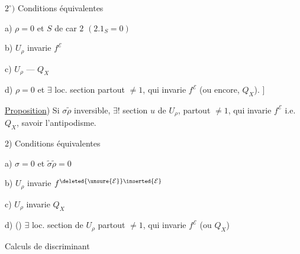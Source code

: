 $2^\circ)$ Conditions équivalentes

a) $\rho=0$ et  $S$ de car $2$ $(2.1_S=0)$

b) $U_\rho$ invarie $f^{\mathcal E}$

c) $U_\rho$ --- $Q_X$

d) $\rho=0$ et $\exists$ loc. section partout $\ne1$,
qui invarie $f^{\mathcal E}$ (ou encore, $Q_X$). ]


\uline{Proposition}) Si $\sigma\widetilde\rho$ inversible,
$\exists!$ section $u$ de $U_\rho$, partout $\ne1$, qui invarie $f^{\mathcal E}$
i.e. $Q_X$, savoir l'antipodisme.

2) Conditions équivalentes

a) $\sigma=0$ et $\widetilde\sigma\widetilde\rho=0$

b) $U_\rho$ invarie $f^{\deleted{\unsure{\mathcal E}}\inserted{\mathcal E}}$

c) $U_\rho$ invarie $Q_X$

d) ()
$\exists$ loc. section de $U_\rho$ partout $\ne1$, qui invarie $f^{\mathcal E}$
(ou $Q_X$)

Calculs de discriminant


